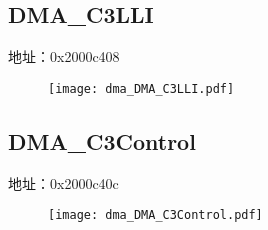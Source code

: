 \subsection{DMA\_C3LLI}
\label{dma-DMA-C3LLI}
地址：0x2000c408
 \begin{figure}[H]
\texttt{[image: dma\_DMA\_C3LLI.pdf]}
\end{figure}

\subsection{DMA\_C3Control}
\label{dma-DMA-C3Control}
地址：0x2000c40c
 \begin{figure}[H]
\texttt{[image: dma\_DMA\_C3Control.pdf]}
\end{figure}

